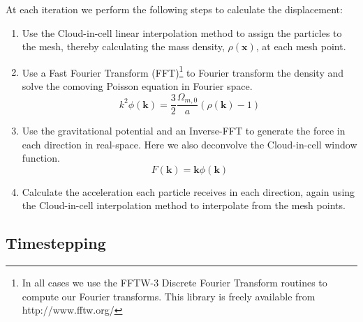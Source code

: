 \documentclass[5p,authoryear]{elsarticle}
\begin{document}
At each iteration we perform the following steps to calculate the displacement:
\begin{enumerate}
\item{Use the Cloud-in-cell linear interpolation method to assign the particles to the mesh, thereby calculating the mass density, $\rho(\boldsymbol{x})$, at each mesh point.}
\item{Use a Fast Fourier Transform (FFT)\footnote{In all cases we use the FFTW-3 Discrete Fourier Transform routines to compute our Fourier transforms. This library is freely available from http://www.fftw.org/} to Fourier transform the density and solve the comoving Poisson equation in Fourier space.}
\begin{equation}
k^2 \phi(\boldsymbol{k}) =  \frac{3}{2}\frac{\Omega_{m,0}}{a}(\rho(\boldsymbol{k})-1)
\end{equation}
\item{Use the gravitational potential and an Inverse-FFT to generate the force in each direction in real-space. Here we also deconvolve the Cloud-in-cell window function.}
\begin{equation}
F(\boldsymbol{k}) = \boldsymbol{k}\phi(\boldsymbol{k})
\end{equation}
\item{Calculate the acceleration each particle receives in each direction, again using the Cloud-in-cell interpolation method to interpolate from the mesh points.}
\end{enumerate}

\subsection{Timestepping}
\end{document}
